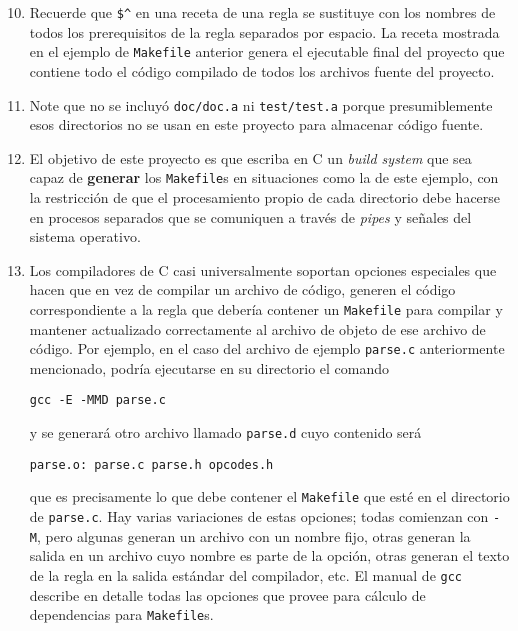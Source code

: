 \documentclass[]{article}
\begin{document}
\begin{enumerate}[1.]
\setcounter{enumi}{9}
\item
  Recuerde que \texttt{\$\^{}} en una receta de una regla se sustituye
  con los nombres de todos los prerequisitos de la regla separados por
  espacio. La receta mostrada en el ejemplo de \texttt{Makefile}
  anterior genera el ejecutable final del proyecto que contiene todo el
  código compilado de todos los archivos fuente del proyecto.
\item
  Note que no se incluyó \texttt{doc/doc.a} ni \texttt{test/test.a}
  porque presumiblemente esos directorios no se usan en este proyecto
  para almacenar código fuente.
\item
  El objetivo de este proyecto es que escriba en C un \emph{build
  system} que sea capaz de \textbf{generar} los \texttt{Makefile}s en
  situaciones como la de este ejemplo, con la restricción de que el
  procesamiento propio de cada directorio debe hacerse en procesos
  separados que se comuniquen a través de \emph{pipes} y señales del
  sistema operativo.
\item
  Los compiladores de C casi universalmente soportan opciones especiales
  que hacen que en vez de compilar un archivo de código, generen el
  código correspondiente a la regla que debería contener un
  \texttt{Makefile} para compilar y mantener actualizado correctamente
  al archivo de objeto de ese archivo de código. Por ejemplo, en el caso
  del archivo de ejemplo \texttt{parse.c} anteriormente mencionado,
  podría ejecutarse en su directorio el comando

\begin{verbatim}
gcc -E -MMD parse.c
\end{verbatim}
  y se generará otro archivo llamado \texttt{parse.d} cuyo contenido
  será

\begin{verbatim}
parse.o: parse.c parse.h opcodes.h
\end{verbatim}
  que es precisamente lo que debe contener el \texttt{Makefile} que esté
  en el directorio de \texttt{parse.c}. Hay varias variaciones de estas
  opciones; todas comienzan con \texttt{-M}, pero algunas generan un
  archivo con un nombre fijo, otras generan la salida en un archivo cuyo
  nombre es parte de la opción, otras generan el texto de la regla en la
  salida estándar del compilador, etc. El manual de \texttt{gcc}
  describe en detalle todas las opciones que provee para cálculo de
  dependencias para \texttt{Makefile}s.
\end{enumerate}
\pagebreak
\end{document}
